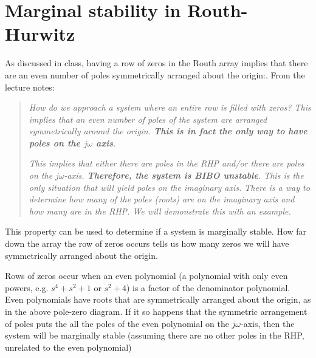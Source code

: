 \documentclass{book}
\newcommand{\jw}{j\omega}
\begin{document}
\section*{Marginal stability in Routh-Hurwitz}
As discussed in class, having a row of zeros in the Routh array implies that there are an even number of poles symmetrically arranged about the origin:. From the lecture notes:

\begin{quote}
	\textit{How do we approach a system where an entire row is filled with zeros? This implies that an even number of poles of the system are arranged symmetrically around the origin. \textbf{This is in fact the only way to have poles on the $ \jw $ axis}.}
	\begin{center}
	\end{center}
	\textit{This implies that either there are poles in the RHP and/or there are poles on the $ j\omega $-axis. \textbf{Therefore, the system is BIBO unstable}. This is the only situation that will yield poles on the imaginary axis. There is a way to determine how many of the poles (roots) are on the imaginary axis and how many are in the RHP. We will demonstrate this with an example.}
\end{quote}

This property can be used to determine if a system is marginally stable. How far down the array the row of zeros occurs tells us how many zeros we will have symmetrically arranged about the origin. 

Rows of zeros occur when an even polynomial (a polynomial with only even powers, e.g. $ s^4+s^2+1 $ or $ s^2+4 $) is a factor of the denominator polynomial. Even polynomials have roots that are symmetrically arranged about the origin, as in the above pole-zero diagram. If it so happens that the symmetric arrangement of poles puts the all the poles of the even polynomial on the $ j\omega $-axis, then the system will be marginally stable (assuming there are no other poles in the RHP, unrelated to the even polynomial)
\end{document}
